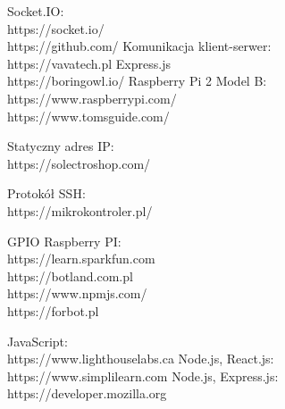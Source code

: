 \begin{thebibliography}{1}
 Socket.IO:
\\
https://socket.io/
\\
https://github.com/
Komunikacja klient-serwer:
\\
 https://vavatech.pl
 Express.js
\\ 
https://boringowl.io/
Raspberry Pi 2 Model B:
\\
https://www.raspberrypi.com/
\\
https://www.tomsguide.com/

 Statyczny adres IP:
\\
https://solectroshop.com/

 Protokół SSH:
\\
https://mikrokontroler.pl/

 GPIO Raspberry PI:
\\
https://learn.sparkfun.com
\\
https://botland.com.pl
\\
https://www.npmjs.com/
\\
https://forbot.pl

 JavaScript:
\\
https://www.lighthouselabs.ca
Node.js, React.js:
\\
https://www.simplilearn.com
Node.js, Express.js:
\\
https://developer.mozilla.org

\end{thebibliography}


